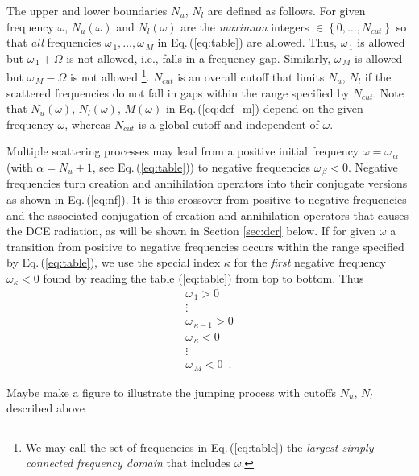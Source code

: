 %
The upper and lower boundaries $N_u$, $N_l$ are  defined as follows. 
For given frequency $\omega$, $N_u(\omega)$ and $N_l(\omega)$
are the {\em maximum} integers $\in \left\{0, \ldots, N_{cut} \right\}$ so that {\em all} frequencies
$\omega_{\,1}, \ldots, \omega_{\,M}$ in Eq.\,(\ref{eq:table}) are allowed. 
Thus, $\omega_{\,1}$ is allowed but $\omega_{\,1} + \Omega$ 
is not allowed, i.e., falls in a frequency gap. Similarly,
$\omega_{\,M}$ is allowed but $\omega_{\,M} - \Omega$ is not allowed
%
\footnote{We may call the set of frequencies in Eq.\,(\ref{eq:table}) the {\em largest 
simply connected frequency domain} that includes $\omega$.}.
%
$N_{cut}$ is an overall cutoff that limits $N_u$, $N_l$ if the scattered frequencies 
do not fall in gaps within the range specified by $N_{cut}$. 
Note that $N_u(\omega)$, $N_l(\omega)$, $M(\omega)$ in Eq.\,(\ref{eq:def_m}) 
depend on the given frequency $\omega$, whereas $N_{cut}$ is a global cutoff 
and independent of $\omega$. 

Multiple scattering processes may lead from a positive initial frequency 
$\omega = \omega_{\,\alpha}$ (with $\alpha = N_u + 1$, see Eq.\,(\ref{eq:table}))
to negative frequencies $\omega_{\,\beta} < 0$. 
Negative frequencies turn creation and annihilation operators into their conjugate 
versions as shown in Eq.\,(\ref{eq:nf}). It is this crossover from positive to 
negative frequencies and the associated conjugation of 
creation and annihilation operators that causes the DCE radiation, as will be 
shown in Section \ref{sec:dcr} below.
%
If for given $\omega$ a transition from positive to negative frequencies
occurs within the range specified by Eq.\,(\ref{eq:table}),
we use the special index $\kappa$ for the {\em first} negative frequency 
$\omega_{\kappa}<0$ found by reading the table (\ref{eq:table}) from top to bottom. 
Thus
%
\begin{equation} \label{eq:table_kappa}
\begin{array}{l}
\omega_{\,1} > 0 \\
\vdots \\
\omega_{\,\kappa-1} > 0 \\
\omega_{\,\kappa} < 0 \\
\vdots \\
\omega_{\,M} < 0 \, \, \, .
\end{array}
\end{equation}

\color{red}
Maybe make a figure to illustrate the jumping process with cutoffs $N_u$, $N_l$ described above
\color{black}

